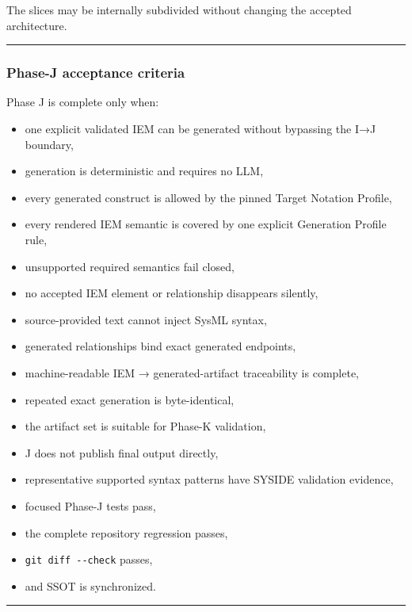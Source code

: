 The slices may be internally subdivided without changing the accepted architecture.

\begin{center}\rule{0.5\linewidth}{0.5pt}\end{center}

\hypertarget{phase-j-acceptance-criteria}{%
\subsubsection{Phase-J acceptance criteria}\label{phase-j-acceptance-criteria}}

Phase J is complete only when:

\begin{itemize}
\tightlist
\item
  one explicit validated IEM can be generated without bypassing the I→J boundary,
\item
  generation is deterministic and requires no LLM,
\item
  every generated construct is allowed by the pinned Target Notation Profile,
\item
  every rendered IEM semantic is covered by one explicit Generation Profile rule,
\item
  unsupported required semantics fail closed,
\item
  no accepted IEM element or relationship disappears silently,
\item
  source-provided text cannot inject SysML syntax,
\item
  generated relationships bind exact generated endpoints,
\item
  machine-readable IEM → generated-artifact traceability is complete,
\item
  repeated exact generation is byte-identical,
\item
  the artifact set is suitable for Phase-K validation,
\item
  J does not publish final output directly,
\item
  representative supported syntax patterns have SYSIDE validation evidence,
\item
  focused Phase-J tests pass,
\item
  the complete repository regression passes,
\item
  \texttt{git\ diff\ -\/-check} passes,
\item
  and SSOT is synchronized.
\end{itemize}

\begin{center}\rule{0.5\linewidth}{0.5pt}\end{center}

